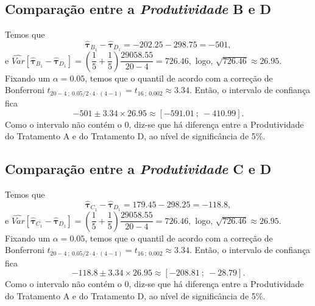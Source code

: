 \subsection*{Comparação entre a \textit{Produtividade} B e D}

Temos que $$\boldsymbol{\widehat{\tau}}_{B_{1}} - \boldsymbol{\widehat{\tau}}_{D_{1}} = -202.25 - 298.75 = -501,$$ e $\widehat{Var}\left[\boldsymbol{\widehat{\tau}}_{B_{1}} - \boldsymbol{\widehat{\tau}}_{D_{1}}\right] = \left( \dfrac{1}{5} + \dfrac{1}{5} \right) \dfrac{29058.55}{20 - 4} = 726.46,$ logo, $\sqrt{726.46} \approx 26.95$. Fixando um $\alpha = 0.05$, temos que o quantil de acordo com a correção de Bonferroni $t_{20-4 \ ; \ 0.05/2 \cdot 4 \cdot (4-1)} = t_{16 \ ; \ 0.002} \approx 3.34$. Então, o intervalo de confiança fica $$-501 \pm 3.34 \times 26.95 \approx [-591.01 \ ; \ -410.99].$$ Como o intervalo não contém o $0$, diz-se que há diferença entre a Produtividade do Tratamento A e do Tratamento D, ao nível de significância de 5\%.

\subsection*{Comparação entre a \textit{Produtividade} C e D}

Temos que $$\boldsymbol{\widehat{\tau}}_{C_{1}} - \boldsymbol{\widehat{\tau}}_{D_{1}} = 179.45 - 298.25 = -118.8,$$ e $\widehat{Var}\left[\boldsymbol{\widehat{\tau}}_{C_{1}} - \boldsymbol{\widehat{\tau}}_{D_{1}}\right] = \left( \dfrac{1}{5} + \dfrac{1}{5} \right) \dfrac{29058.55}{20 - 4} = 726.46,$ logo, $\sqrt{726.46} \approx 26.95$. Fixando um $\alpha = 0.05$, temos que o quantil de acordo com a correção de Bonferroni $t_{20-4 \ ; \ 0.05/2 \cdot 4 \cdot (4-1)} = t_{16 \ ; \ 0.002} \approx 3.34$. Então, o intervalo de confiança fica $$-118.8 \pm 3.34 \times 26.95 \approx [-208.81 \ ; \ -28.79].$$ Como o intervalo não contém o $0$, diz-se que há diferença entre a Produtividade do Tratamento A e do Tratamento D, ao nível de significância de 5\%.